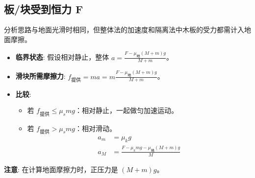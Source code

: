 \documentclass[a4paper,11pt]{ctexart}
\begin{document}
\subsection{板/块受到恒力 F}
分析思路与地面光滑时相同，但整体法的加速度和隔离法中木板的受力都需计入地面摩擦。
\begin{itemize}
    \item \textbf{临界状态}: 假设相对静止，整体 $a = \frac{F - \mu_{地}(M+m)g}{M+m}$。
    \item \textbf{滑块所需摩擦力}: $f_{提供} = ma = m \frac{F - \mu_{地}(M+m)g}{M+m}$。
    \item \textbf{比较}:
        \begin{itemize}
            \item 若 $f_{提供} \le \mu_s mg$：相对静止，一起做匀加速运动。
            \item 若 $f_{提供} > \mu_s mg$：相对滑动。
                \begin{align*}
                    a_m &= \mu_k g \\
                    a_M &= \frac{F - \mu_k mg - \mu_{地}(M+m)g}{M}
                \end{align*}
        \end{itemize}
\end{itemize}
\textcolor{HighlightColor}{\textbf{注意}}: 在计算地面摩擦力时，正压力是 $(M+m)g$。
\end{document}

